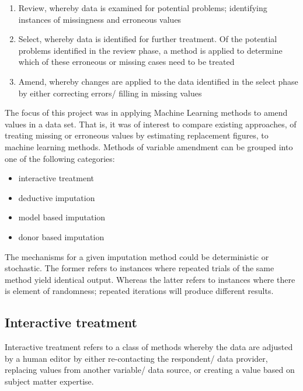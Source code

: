 \documentclass[]{book}
\providecommand{\tightlist}{%
  \setlength{\itemsep}{0pt}\setlength{\parskip}{0pt}}
\begin{document}
\begin{enumerate}
\def\labelenumi{\arabic{enumi})}
\tightlist
\item
  Review, whereby data is examined for potential problems; identifying
  instances of missingness and erroneous values\\
\item
  Select, whereby data is identified for further treatment. Of the
  potential problems identified in the review phase, a method is applied
  to determine which of these erroneous or missing cases need to be
  treated
\item
  Amend, whereby changes are applied to the data identified in the
  select phase by either correcting errors/ filling in missing values
\end{enumerate}

The focus of this project was in applying Machine Learning methods to
amend values in a data set. That is, it was of interest to compare
existing approaches, of treating missing or erroneous values by
estimating replacement figures, to machine learning methods. Methods of
variable amendment can be grouped into one of the following categories:

\begin{itemize}
\tightlist
\item
  interactive treatment\\
\item
  deductive imputation\\
\item
  model based imputation\\
\item
  donor based imputation
\end{itemize}

The mechanisms for a given imputation method could be deterministic or
stochastic. The former refers to instances where repeated trials of the
same method yield identical output. Whereas the latter refers to
instances where there is element of randomness; repeated iterations will
produce different results.

\subsection{Interactive treatment}\label{interactive-treatment}

Interactive treatment refers to a class of methods whereby the data are
adjusted by a human editor by either re-contacting the respondent/ data
provider, replacing values from another variable/ data source, or
creating a value based on subject matter expertise.
\end{document}
